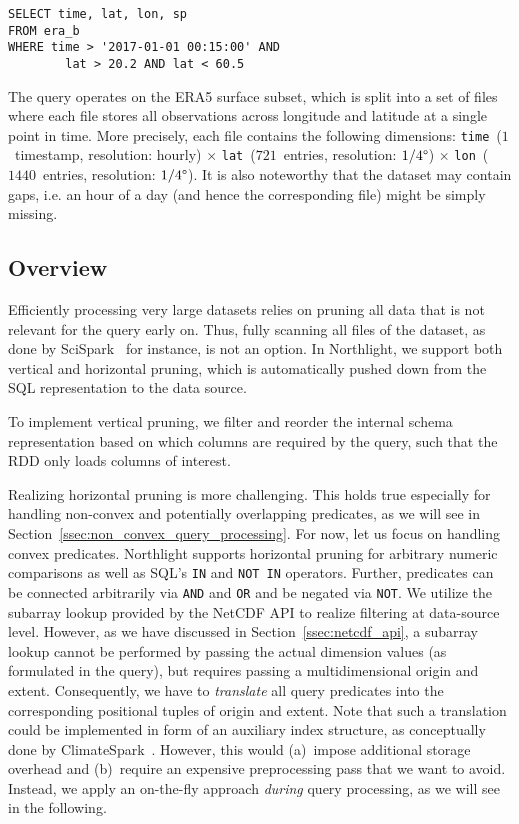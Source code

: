 \documentclass[conference]{IEEEtran}
\newcommand{\system}{Northlight}
\newcommand{\smalltt}[1]{{\texttt{\small #1}}}
\begin{document}
\noindent 
\begin{minipage}{\linewidth}
\begin{lstlisting}[style=sql, caption={Example query~$Q_1$ (convex predicate).}, label={listing:q1}]
SELECT time, lat, lon, sp
FROM era_b
WHERE time > '2017-01-01 00:15:00' AND 
        lat > 20.2 AND lat < 60.5 
\end{lstlisting}
\end{minipage}

\noindent The query operates on the ERA5 surface subset, which is split into a set of files where each file stores all observations across longitude and latitude at a single point in time. More precisely, each file contains the following dimensions: \smalltt{time}~($1$~timestamp, resolution: hourly) $\times$ \smalltt{lat}~($721$~entries, resolution: $1/4\degree$) $\times$ \smalltt{lon}~($1440$~entries, resolution: $1/4\degree$). 
It is also noteworthy that the dataset may contain gaps, i.e. an hour of a day (and hence the corresponding file) might be simply missing.

\subsection{Overview}

Efficiently processing very large datasets relies on pruning all data that is not relevant for the query early on. Thus, fully scanning all files of the dataset, as done by SciSpark~\cite{lit:scispark} for instance, is not an option. In \system{}, we support both vertical and horizontal pruning, which is automatically pushed down from the SQL representation to the data source.

To implement vertical pruning, we filter and reorder the internal schema representation based on which columns are required by the query, such that the RDD only loads columns of interest.

Realizing horizontal pruning is more challenging. This holds true especially for handling non-convex and potentially overlapping predicates, as we will see in Section~\ref{ssec:non_convex_query_processing}. For now, let us focus on handling convex predicates. \system{} supports horizontal pruning for arbitrary numeric comparisons as well as SQL's \smalltt{IN} and \smalltt{NOT IN} operators. Further, predicates can be connected arbitrarily via \smalltt{AND} and \smalltt{OR} and be negated via \smalltt{NOT}.
We utilize the subarray lookup provided by the NetCDF API to realize filtering at data-source level.
However, as we have discussed in Section~\ref{ssec:netcdf_api}, a subarray lookup cannot be performed by passing the actual dimension values (as formulated in the query), but requires passing a multidimensional origin and extent. 
Consequently, we have to \textit{translate} all query predicates into the corresponding positional tuples of origin and extent. 
Note that such a translation could be implemented in form of an auxiliary index structure, as conceptually done by ClimateSpark~\cite{lit:climatespark}. However, this would (a)~impose additional storage overhead and (b)~require an expensive preprocessing pass that we want to avoid. Instead, we apply an on-the-fly approach \textit{during} query processing, as we will see in the following.
\end{document}

